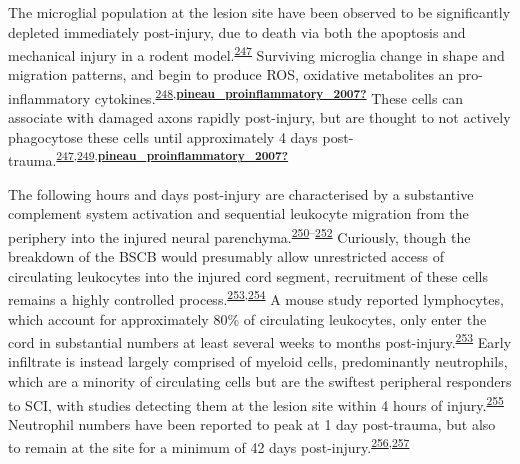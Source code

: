 \documentclass[
]{article}
\begin{document}
The microglial population at the lesion site have been observed to be significantly depleted immediately post-injury, due to death via both the apoptosis and mechanical injury in a rodent model.\textsuperscript{\protect\hyperlink{ref-bellver-landete_microglia_2019}{247}}
Surviving microglia change in shape and migration patterns, and begin to produce ROS, oxidative metabolites an pro-inflammatory cytokines.\textsuperscript{\protect\hyperlink{ref-bastien_cytokine_2014}{248},\protect\hyperlink{ref-pineau_proinflammatory_2007}{\textbf{pineau\_proinflammatory\_2007?}}}
These cells can associate with damaged axons rapidly post-injury, but are thought to not actively phagocytose these cells until approximately 4 days post-trauma.\textsuperscript{\protect\hyperlink{ref-bellver-landete_microglia_2019}{247},\protect\hyperlink{ref-greenhalgh_differences_2014}{249},\protect\hyperlink{ref-pineau_proinflammatory_2007}{\textbf{pineau\_proinflammatory\_2007?}}}

The following hours and days post-injury are characterised by a substantive complement system activation and sequential leukocyte migration from the periphery into the injured neural parenchyma.\textsuperscript{\protect\hyperlink{ref-brennan_complement_2015}{250}--\protect\hyperlink{ref-qiao_complement_2006}{252}}
Curiously, though the breakdown of the BSCB would presumably allow unrestricted access of circulating leukocytes into the injured cord segment, recruitment of these cells remains a highly controlled process.\textsuperscript{\protect\hyperlink{ref-beck_quantitative_2010}{253},\protect\hyperlink{ref-brennan_complement_2019}{254}}
A mouse study reported lymphocytes, which account for approximately 80\% of circulating leukocytes, only enter the cord in substantial numbers at least several weeks to months post-injury.\textsuperscript{\protect\hyperlink{ref-beck_quantitative_2010}{253}}
Early infiltrate is instead largely comprised of myeloid cells, predominantly neutrophils, which are a minority of circulating cells but are the swiftest peripheral responders to SCI, with studies detecting them at the lesion site within 4 hours of injury.\textsuperscript{\protect\hyperlink{ref-wright_neutrophil_2010}{255}}
Neutrophil numbers have been reported to peak at 1 day post-trauma, but also to remain at the site for a minimum of 42 days post-injury.\textsuperscript{\protect\hyperlink{ref-okada_pathophysiological_2016}{256},\protect\hyperlink{ref-kigerl_comparative_2006}{257}}
\end{document}
